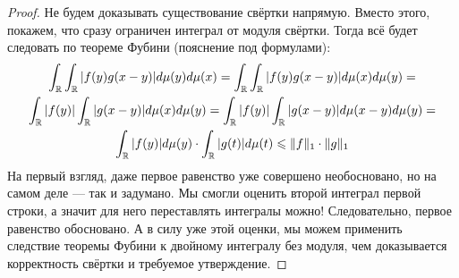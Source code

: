 \begin{proof}
	Не будем доказывать существование свёртки напрямую. Вместо этого, покажем, что сразу ограничен интеграл от модуля свёртки. Тогда всё будет следовать по теореме Фубини (пояснение под формулами):
	\begin{multline*}
		\int_{\mathbb{R}} \int_{\mathbb{R}} |f(y)g(x - y)|d\mu(y)d\mu(x) = \int_{\mathbb{R}} \int_{\mathbb{R}} |f(y)g(x - y)|d\mu(x)d\mu(y) =
		\\
		\int_{\mathbb{R}} |f(y)| \int_{\mathbb{R}} |g(x - y)|d\mu(x)d\mu(y) = \int_{\mathbb{R}} |f(y)| \int_{\mathbb{R}} |g(x - y)|d\mu(x - y)d\mu(y) =
		\\
		\int_{\mathbb{R}} |f(y)|d\mu(y) \cdot \int_{\mathbb{R}} |g(t)|d\mu(t) \leqslant \|f\|_1 \cdot \|g\|_1
	\end{multline*}
	На первый взгляд, даже первое равенство уже совершено необосновано, но на самом деле --- так и задумано. Мы смогли оценить второй интеграл первой строки, а значит для него переставлять интегралы можно! Следовательно, первое равенство обосновано. А в силу уже этой оценки, мы можем применить следствие теоремы Фубини к двойному интегралу без модуля, чем доказывается корректность свёртки и требуемое утверждение.
\end{proof}